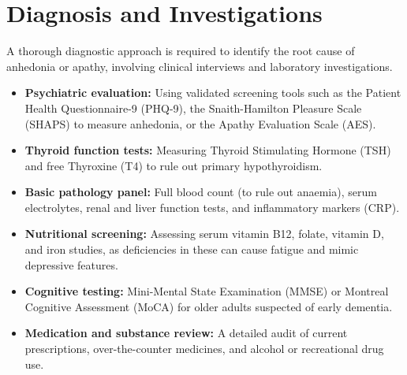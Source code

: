 \section*{Diagnosis and Investigations}
A thorough diagnostic approach is required to identify the root cause of anhedonia or apathy, involving clinical interviews and laboratory investigations.
\begin{itemize}
    \item \textbf{Psychiatric evaluation:} Using validated screening tools such as the Patient Health Questionnaire-9 (PHQ-9), the Snaith-Hamilton Pleasure Scale (SHAPS) to measure anhedonia, or the Apathy Evaluation Scale (AES).
    \item \textbf{Thyroid function tests:} Measuring Thyroid Stimulating Hormone (TSH) and free Thyroxine (T4) to rule out primary hypothyroidism.
    \item \textbf{Basic pathology panel:} Full blood count (to rule out anaemia), serum electrolytes, renal and liver function tests, and inflammatory markers (CRP).
    \item \textbf{Nutritional screening:} Assessing serum vitamin B12, folate, vitamin D, and iron studies, as deficiencies in these can cause fatigue and mimic depressive features.
    \item \textbf{Cognitive testing:} Mini-Mental State Examination (MMSE) or Montreal Cognitive Assessment (MoCA) for older adults suspected of early dementia.
    \item \textbf{Medication and substance review:} A detailed audit of current prescriptions, over-the-counter medicines, and alcohol or recreational drug use.
\end{itemize}

